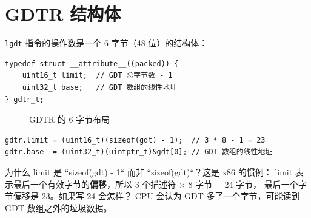 \section{GDTR 结构体}

\texttt{lgdt} 指令的操作数是一个 6 字节（48 位）的结构体：

\begin{lstlisting}[style=cstyle]
typedef struct __attribute__((packed)) {
    uint16_t limit;  // GDT 总字节数 - 1
    uint32_t base;   // GDT 数组的线性地址
} gdtr_t;
\end{lstlisting}

\begin{figure}[H]
  \centering
  
  \caption{GDTR 的 6 字节布局}
\end{figure}

\begin{lstlisting}[style=cstyle]
gdtr.limit = (uint16_t)(sizeof(gdt) - 1);  // 3 * 8 - 1 = 23
gdtr.base  = (uint32_t)(uintptr_t)&gdt[0]; // GDT 数组的线性地址
\end{lstlisting}

\begin{thinkbox}
为什么 limit 是 ``sizeof(gdt) - 1`` 而非 ``sizeof(gdt)``？这是 x86 的惯例：
limit 表示最后一个有效字节的\textbf{偏移}，所以 3 个描述符 $\times$ 8 字节 = 24 字节，
最后一个字节偏移是 23。如果写 24 会怎样？
CPU 会认为 GDT 多了一个字节，可能读到 GDT 数组之外的垃圾数据。
\end{thinkbox}


